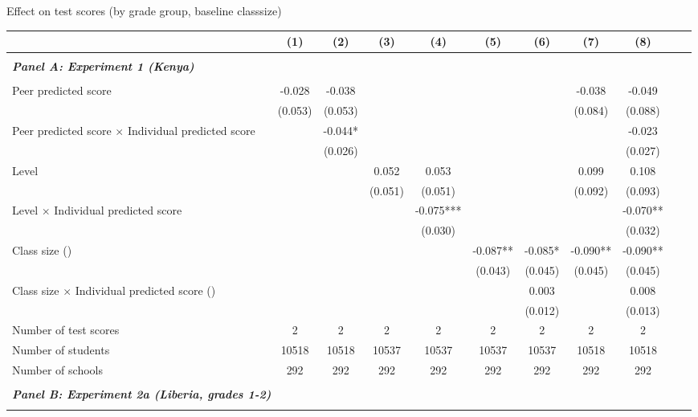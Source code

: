 \begin{center} 
\caption{\small Effect on test scores (by grade group, baseline classsize)} 
\label{tab:descriptives} 
\begin{scriptsize}
\begin{threeparttable}
\begin{tabular} {@{} l l c c c c c c c c c c  @{}} \toprule \toprule
& &(1)&(2)&(3)&(4)&(5)&(6)&(7)&(8) \\ \midrule 
\\
\multicolumn{3}{l}{\textbf{\textit{Panel A: Experiment 1 (Kenya)}}} \\
\\
Peer predicted score &  & -0.028 & -0.038 &  &  &  &  & -0.038 & -0.049 \\
                 &  & (0.053) & (0.053) &  &  &  &  & (0.084) & (0.088) \\
Peer predicted score $\times$ Individual predicted score &  &  & -0.044* &  &  &  &  &  & -0.023 \\
                 &  &  & (0.026) &  &  &  &  &  & (0.027) \\
Level &  &  &  & 0.052 & 0.053 &  &  & 0.099 & 0.108 \\
                 &  &  &  & (0.051) & (0.051) &  &  & (0.092) & (0.093) \\
Level $\times$ Individual predicted score &  &  &  &  & -0.075*** &  &  &  & -0.070** \\
                 &  &  &  &  & (0.030) &  &  &  & (0.032) \\
Class size (\times 10) &  &  &  &  &  & -0.087** & -0.085* & -0.090** & -0.090** \\
                 &  &  &  &  &  & (0.043) & (0.045) & (0.045) & (0.045) \\
Class size $\times$ Individual predicted score (\times 10) &  &  &  &  &  &  & 0.003 &  & 0.008 \\
                 &  &  &  &  &  &  & (0.012) &  & (0.013) \\
\midrule
Number of test scores &  & 2 & 2 & 2 & 2 & 2 & 2 & 2 & 2 \\
Number of students &  & 10518 & 10518 & 10537 & 10537 & 10537 & 10537 & 10518 & 10518 \\
Number of schools &  & 292 & 292 & 292 & 292 & 292 & 292 & 292 & 292 \\
 \midrule
\\
\multicolumn{3}{l}{\textbf{\textit{Panel B: Experiment 2a (Liberia, grades 1-2)}}} \\
\\

\end{tabular}
\end{threeparttable}
\end{scriptsize}
\end{center}
